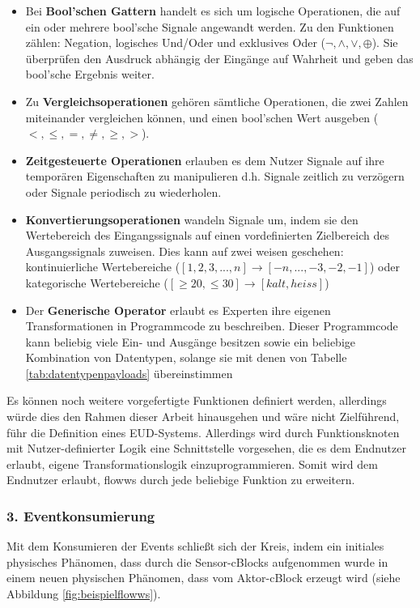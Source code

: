  \begin{itemize} 
     \item Bei \textbf{Bool'schen Gattern} handelt es sich um logische Operationen, die auf ein oder mehrere bool'sche Signale angewandt werden. Zu den Funktionen zählen: Negation, logisches Und/Oder und exklusives Oder ($\neg, \land, \lor, \oplus$). Sie überprüfen den Ausdruck abhängig der Eingänge auf Wahrheit und geben das bool'sche Ergebnis weiter.
     \item Zu \textbf{Vergleichsoperationen} gehören sämtliche Operationen, die zwei Zahlen miteinander vergleichen können, und einen bool'schen Wert ausgeben ($<,\leq,=,\neq,\geq,>$).
     \item \textbf{Zeitgesteuerte Operationen} erlauben es dem Nutzer Signale auf ihre temporären Eigenschaften zu manipulieren d.h. Signale zeitlich zu verzögern oder Signale periodisch zu wiederholen.
     \item \textbf{Konvertierungsoperationen} wandeln Signale um, indem sie den Wertebereich des Eingangssignals auf einen vordefinierten Zielbereich des Ausgangssignals zuweisen. Dies kann auf zwei weisen geschehen: kontinuierliche Wertebereiche ($\left [ 1,2,3,...,n \right ] \rightarrow \left [ -n,...,-3,-2,-1 \right ]$) oder kategorische Wertebereiche ($\left [ \geq20, \leq30  \right ] \rightarrow \left [ kalt,heiss \right ]$)
     \item Der \textbf{Generische Operator} erlaubt es Experten ihre eigenen Transformationen in Programmcode zu beschreiben. Dieser Programmcode kann beliebig viele Ein- und Ausgänge besitzen sowie ein beliebige Kombination von Datentypen, solange sie mit denen von Tabelle \ref{tab:datentypenpayloads} übereinstimmen
 \end{itemize}
 Es können noch weitere vorgefertigte Funktionen definiert werden, allerdings würde dies den Rahmen dieser Arbeit hinausgehen und wäre nicht Zielführend, führ die Definition eines \ac{EUD}-Systems. Allerdings wird durch Funktionsknoten mit Nutzer-definierter Logik eine Schnittstelle vorgesehen, die es dem Endnutzer erlaubt, eigene Transformationslogik einzuprogrammieren. Somit wird dem Endnutzer erlaubt, flowws durch jede beliebige Funktion zu erweitern.
 
\subsubsection{3. Eventkonsumierung} \label{subsubsec:evebtkonsumierung}
Mit dem Konsumieren der Events schließt sich der Kreis, indem ein initiales physisches Phänomen, dass durch die Sensor-cBlocks aufgenommen wurde in einem neuen physischen Phänomen, dass vom Aktor-cBlock erzeugt wird (siehe Abbildung \ref{fig:beispielflowws}). 

